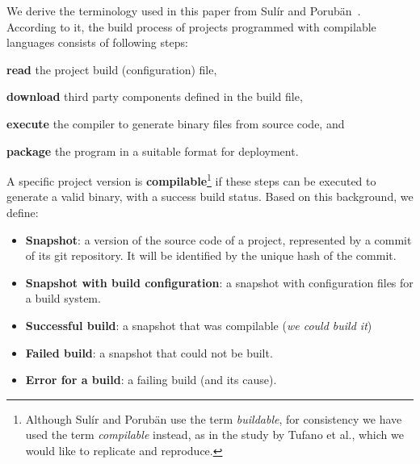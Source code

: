 We derive the terminology used in this paper from Sul\'ir and Porubän~\cite{Sulir:2016:QSJ:3001878.3001882}. According to it, the build process of projects programmed with compilable languages consists of following steps:
\begin{inparaenum}[\bf(1)]
    \item \textbf{read} the project build (configuration) file,
    \item \textbf{download} third party components defined in the build file,
    \item \textbf{execute} the compiler to generate  binary files from source code, and
    \item \textbf{package} the program in a suitable format for deployment.
\end{inparaenum}

A specific project version is {\bf compilable}\footnote{Although Sul\'ir and Porubän use the term \textit{buildable}, for consistency we have used the term \textit{compilable} instead, as in the study by Tufano et al., which we would like to replicate and reproduce.} if these steps can be executed to generate a valid binary, with a success build status. Based on this background, we define:

\begin{itemize}
\item \textbf{Snapshot}: a version of the source code of a project, represented by a commit of its git repository. It will be identified by the unique hash of the commit.
\item \textbf{Snapshot with build configuration}: a snapshot with configuration files for a build system.
\item \textbf{Successful build}: a snapshot that was compilable (\emph{we could build it})
\item \textbf{Failed build}: a snapshot that could not be built.
\item \textbf{Error for a build}: a failing build (and its cause).
\end{itemize}
